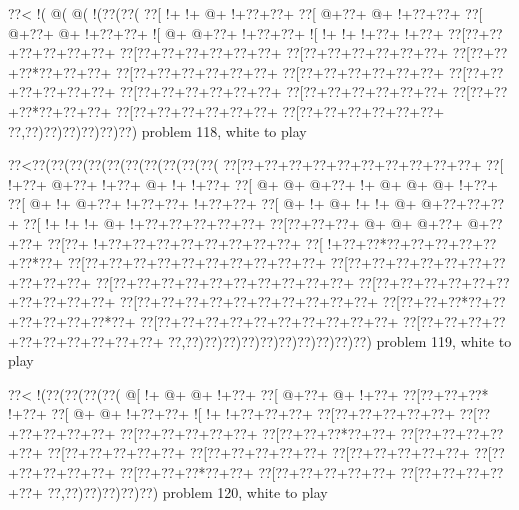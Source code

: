 \vbox{\vbox{\goo
\0??<\- !(\- @(\- @(\- !(\0??(\0??(
\0??[\- !+\- !+\- @+\- !+\0??+\0??+
\0??[\- @+\0??+\- @+\- !+\0??+\0??+
\0??[\- @+\0??+\- @+\- !+\0??+\0??+
\- ![\- @+\- @+\0??+\- !+\0??+\0??+
\- ![\- !+\- !+\- !+\0??+\- !+\0??+
\0??[\0??+\0??+\0??+\0??+\0??+\0??+
\0??[\0??+\0??+\0??+\0??+\0??+\0??+
\0??[\0??+\0??+\0??+\0??+\0??+\0??+
\0??[\0??+\0??+\0??*\0??+\0??+\0??+
\0??[\0??+\0??+\0??+\0??+\0??+\0??+
\0??[\0??+\0??+\0??+\0??+\0??+\0??+
\0??[\0??+\0??+\0??+\0??+\0??+\0??+
\0??[\0??+\0??+\0??+\0??+\0??+\0??+
\0??[\0??+\0??+\0??+\0??+\0??+\0??+
\0??[\0??+\0??+\0??*\0??+\0??+\0??+
\0??[\0??+\0??+\0??+\0??+\0??+\0??+
\0??[\0??+\0??+\0??+\0??+\0??+\0??+
\0??,\0??)\0??)\0??)\0??)\0??)\0??)
}
\hfil problem 118, white to play\hfil\break
}

\vbox{\vbox{\goo
\0??<\0??(\0??(\0??(\0??(\0??(\0??(\0??(\0??(\0??(\0??(
\0??[\0??+\0??+\0??+\0??+\0??+\0??+\0??+\0??+\0??+\0??+
\0??[\- !+\0??+\- @+\0??+\- !+\0??+\- @+\- !+\- !+\0??+
\0??[\- @+\- @+\- @+\0??+\- !+\- @+\- @+\- @+\- !+\0??+
\0??[\- @+\- !+\- @+\0??+\- !+\0??+\0??+\- !+\0??+\0??+
\0??[\- @+\- !+\- @+\- !+\- !+\- @+\- @+\0??+\0??+\0??+
\0??[\- !+\- !+\- !+\- @+\- !+\0??+\0??+\0??+\0??+\0??+
\0??[\0??+\0??+\0??+\- @+\- @+\- @+\0??+\- @+\0??+\0??+
\0??[\0??+\- !+\0??+\0??+\0??+\0??+\0??+\0??+\0??+\0??+
\0??[\- !+\0??+\0??*\0??+\0??+\0??+\0??+\0??+\0??*\0??+
\0??[\0??+\0??+\0??+\0??+\0??+\0??+\0??+\0??+\0??+\0??+
\0??[\0??+\0??+\0??+\0??+\0??+\0??+\0??+\0??+\0??+\0??+
\0??[\0??+\0??+\0??+\0??+\0??+\0??+\0??+\0??+\0??+\0??+
\0??[\0??+\0??+\0??+\0??+\0??+\0??+\0??+\0??+\0??+\0??+
\0??[\0??+\0??+\0??+\0??+\0??+\0??+\0??+\0??+\0??+\0??+
\0??[\0??+\0??+\0??*\0??+\0??+\0??+\0??+\0??+\0??*\0??+
\0??[\0??+\0??+\0??+\0??+\0??+\0??+\0??+\0??+\0??+\0??+
\0??[\0??+\0??+\0??+\0??+\0??+\0??+\0??+\0??+\0??+\0??+
\0??,\0??)\0??)\0??)\0??)\0??)\0??)\0??)\0??)\0??)\0??)
}
\hfil problem 119, white to play\hfil\break
}

\vbox{\vbox{\goo
\0??<\- !(\0??(\0??(\0??(\0??(
\- @[\- !+\- @+\- @+\- !+\0??+
\0??[\- @+\0??+\- @+\- !+\0??+
\0??[\0??+\0??+\0??*\- !+\0??+
\0??[\- @+\- @+\- !+\0??+\0??+
\- ![\- !+\- !+\0??+\0??+\0??+
\0??[\0??+\0??+\0??+\0??+\0??+
\0??[\0??+\0??+\0??+\0??+\0??+
\0??[\0??+\0??+\0??+\0??+\0??+
\0??[\0??+\0??+\0??*\0??+\0??+
\0??[\0??+\0??+\0??+\0??+\0??+
\0??[\0??+\0??+\0??+\0??+\0??+
\0??[\0??+\0??+\0??+\0??+\0??+
\0??[\0??+\0??+\0??+\0??+\0??+
\0??[\0??+\0??+\0??+\0??+\0??+
\0??[\0??+\0??+\0??*\0??+\0??+
\0??[\0??+\0??+\0??+\0??+\0??+
\0??[\0??+\0??+\0??+\0??+\0??+
\0??,\0??)\0??)\0??)\0??)\0??)
}
\hfil problem 120, white to play\hfil\break
}

